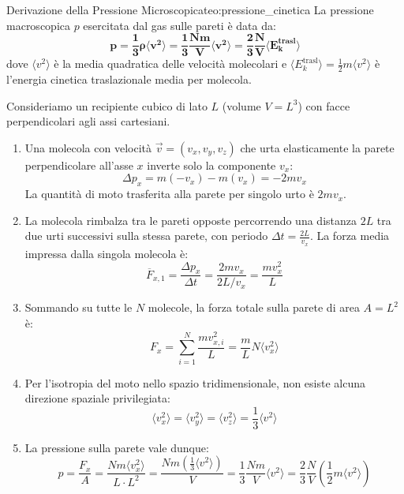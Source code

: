 \begin{teorema}{Derivazione della Pressione Microscopica}{teo:pressione_cinetica}
La pressione macroscopica $p$ esercitata dal gas sulle pareti è data da:
\begin{equation}
    \mathbf{p = \frac{1}{3}\rho \langle v^2 \rangle = \frac{1}{3}\frac{N m}{V}\langle v^2 \rangle = \frac{2}{3}\frac{N}{V}\langle E_k^{\text{trasl}}\rangle}
    \label{eq:pressione_micro}
\end{equation}
dove $\langle v^2 \rangle$ è la media quadratica delle velocità molecolari e $\langle E_k^{\text{trasl}}\rangle = \frac{1}{2}m\langle v^2\rangle$ è l'energia cinetica traslazionale media per molecola.
\end{teorema}

\begin{dimostrazione}
Consideriamo un recipiente cubico di lato $L$ (volume $V = L^3$) con facce perpendicolari agli assi cartesiani.
\begin{enumerate}
    \item Una molecola con velocità $\vec{v} = (v_x, v_y, v_z)$ che urta elasticamente la parete perpendicolare all'asse $x$ inverte solo la componente $v_x$:
    \begin{equation}
        \Delta p_x = m(-v_x) - m(v_x) = -2m v_x
    \end{equation}
    La quantità di moto trasferita alla parete per singolo urto è $2m v_x$.
    \item La molecola rimbalza tra le pareti opposte percorrendo una distanza $2L$ tra due urti successivi sulla stessa parete, con periodo $\Delta t = \frac{2L}{v_x}$. La forza media impressa dalla singola molecola è:
    \begin{equation}
        \overline{F}_{x,1} = \frac{\Delta p_x}{\Delta t} = \frac{2m v_x}{2L/v_x} = \frac{m v_x^2}{L}
    \end{equation}
    \item Sommando su tutte le $N$ molecole, la forza totale sulla parete di area $A = L^2$ è:
    \begin{equation}
        F_x = \sum_{i=1}^N \frac{m v_{x,i}^2}{L} = \frac{m}{L} N \langle v_x^2 \rangle
    \end{equation}
    \item Per l'isotropia del moto nello spazio tridimensionale, non esiste alcuna direzione spaziale privilegiata:
    \begin{equation}
        \langle v_x^2 \rangle = \langle v_y^2 \rangle = \langle v_z^2 \rangle = \frac{1}{3}\langle v^2 \rangle
    \end{equation}
    \item La pressione sulla parete vale dunque:
    \begin{equation}
        p = \frac{F_x}{A} = \frac{N m \langle v_x^2 \rangle}{L \cdot L^2} = \frac{N m \left(\frac{1}{3}\langle v^2 \rangle\right)}{V} = \frac{1}{3}\frac{Nm}{V}\langle v^2 \rangle = \frac{2}{3}\frac{N}{V}\left(\frac{1}{2}m\langle v^2 \rangle\right)
    \end{equation}
\end{enumerate}
\end{dimostrazione}

